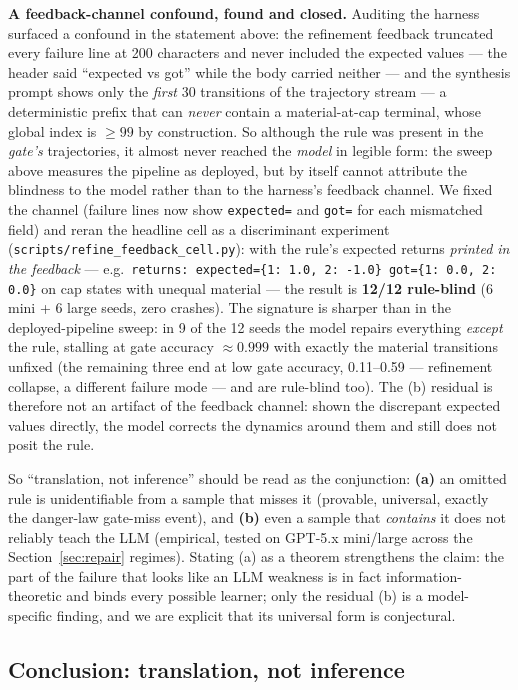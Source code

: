 \documentclass[11pt]{article}
\theoremstyle{remark}
\begin{document}
\textbf{A feedback-channel confound, found and closed.} Auditing the harness surfaced a confound in the statement above: the refinement feedback truncated every failure line at 200 characters and never included the expected values --- the header said ``expected vs got'' while the body carried neither --- and the synthesis prompt shows only the \emph{first} 30 transitions of the trajectory stream --- a deterministic prefix that can \emph{never} contain a material-at-cap terminal, whose global index is $\geq 99$ by construction. So although the rule was present in the \emph{gate's} trajectories, it almost never reached the \emph{model} in legible form: the sweep above measures the pipeline as deployed, but by itself cannot attribute the blindness to the model rather than to the harness's feedback channel. We fixed the channel (failure lines now show \texttt{expected=} and \texttt{got=} for each mismatched field) and reran the headline cell as a discriminant experiment (\texttt{scripts/refine\_feedback\_cell.py}): with the rule's expected returns \emph{printed in the feedback} --- e.g.\ \texttt{returns: expected=\{1: 1.0, 2: -1.0\} got=\{1: 0.0, 2: 0.0\}} on cap states with unequal material --- the result is \textbf{12/12 rule-blind} (6 mini + 6 large seeds, zero crashes). The signature is sharper than in the deployed-pipeline sweep: in 9 of the 12 seeds the model repairs everything \emph{except} the rule, stalling at gate accuracy ${\approx}0.999$ with exactly the material transitions unfixed (the remaining three end at low gate accuracy, 0.11--0.59 --- refinement collapse, a different failure mode --- and are rule-blind too). The (b) residual is therefore not an artifact of the feedback channel: shown the discrepant expected values directly, the model corrects the dynamics around them and still does not posit the rule.

So ``translation, not inference'' should be read as the conjunction: \textbf{(a)} an omitted rule is unidentifiable from a sample that misses it (provable, universal, exactly the danger-law gate-miss event), and \textbf{(b)} even a sample that \emph{contains} it does not reliably teach the LLM (empirical, tested on GPT-5.x mini/large across the Section~\ref{sec:repair} regimes). Stating (a) as a theorem strengthens the claim: the part of the failure that looks like an LLM weakness is in fact information-theoretic and binds every possible learner; only the residual (b) is a model-specific finding, and we are explicit that its universal form is conjectural.

\subsection{Conclusion: translation, not inference}
\end{document}
